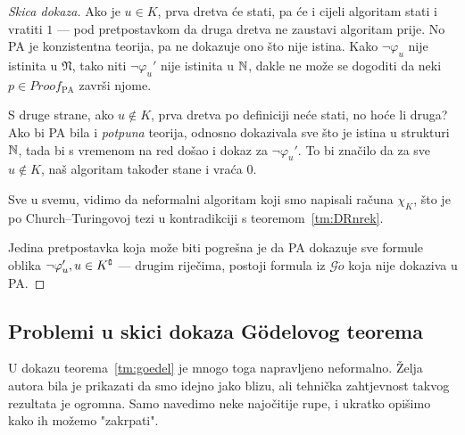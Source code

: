\begin{proof}[Skica dokaza]
Ako je $u\in K$, prva dretva će stati, pa će i cijeli algoritam stati i vratiti $1$ --- pod pretpostavkom da druga dretva ne zaustavi algoritam prije. No PA je konzistentna teorija, pa ne dokazuje ono što nije istina. Kako $\neg\varphi_u$ nije istinita u $\mathfrak N$, tako niti $\neg\varphi_u'$ nije istinita u ${\mathbb N}$, dakle ne može se dogoditi da neki $p\in Proof_{\text{PA}}$ završi njome.

S druge strane, ako $u\notin K$, prva dretva po definiciji neće stati, no hoće li druga? Ako bi PA bila i \emph{potpuna} teorija, odnosno dokazivala sve što je istina u strukturi ${\mathbb N}$, tada bi s vremenom na red došao i dokaz za $\neg\varphi_u'$. To bi značilo da za sve $u\notin K$, naš algoritam također stane i vraća $0$.

Sve u svemu, vidimo da neformalni algoritam koji smo napisali računa $\chi_{K}$, što je po Church--\!Turingovoj tezi u kontradikciji s teoremom~\ref{tm:DRnrek}.

Jedina pretpostavka koja može biti pogrešna je da PA dokazuje sve formule oblika $\neg\varphi_u', u\in K\sp{{\scriptscriptstyle\complement}}$ --- drugim riječima, postoji formula iz $\mathscr G\ddot o$ koja nije dokaziva u PA\@.
\end{proof}

\subsection{Problemi u skici dokaza Gödelovog teorema}

U dokazu teorema~\ref{tm:goedel} je mnogo toga napravljeno neformalno. Želja autora bila je prikazati da smo idejno jako blizu, ali tehnička zahtjevnost takvog rezultata je ogromna. Samo navedimo neke najočitije rupe, i ukratko opišimo kako ih možemo "zakrpati".


